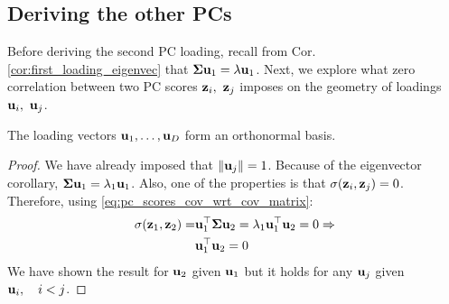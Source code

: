\documentclass[a4paper]{article}
\begin{document}
\subsection{Deriving the other PCs}

Before deriving the second PC loading, recall from Cor. \ref{cor:first_loading_eigenvec} that $\boldsymbol{\Sigma}\textbf{u}_1 = \lambda\textbf{u}_1$.
Next, we explore what zero correlation between two PC scores $\textbf{z}_i,\ \textbf{z}_j$ imposes on the  geometry of loadings $\bu_i,\ \bu_j$.
\begin{corollary} The loading vectors $\textbf{u}_1,\ldots,\textbf{u}_D$ form an orthonormal basis.
\label{cor:loading_vec_ortho}
\end{corollary}
\begin{proof}
We have already imposed that $\left\lVert\textbf{u}_j\right\rVert=1$. Because of the eigenvector corollary, $\boldsymbol{\Sigma}\textbf{u}_1 = \lambda_1\textbf{u}_1$. Also, one of the properties is that $\sigma(\textbf{z}_i,\textbf{z}_j)=0$. Therefore, using \eqref{eq:pc_scores_cov_wrt_cov_matrix}:
\begin{align*}
\sigma(\textbf{z}_1,\textbf{z}_2) = &\textbf{u}_1^{\top}\boldsymbol{\Sigma}\textbf{u}_2 = \lambda_1\textbf{u}_1^{\top}\textbf{u}_2 = 0 \Rightarrow\\
&\textbf{u}_1^{\top}\textbf{u}_2=0
\end{align*}
We have shown the result for $\textbf{u}_2$ given $\textbf{u}_1$ but it holds for any $\textbf{u}_j$ given $\textbf{u}_i, \quad i < j$.
\end{proof}

\end{document}
